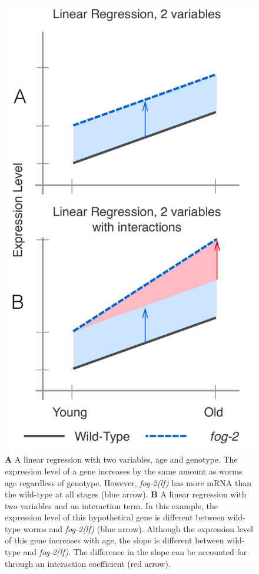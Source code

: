 \documentclass[10pt,letterpaper,twocolumn]{article}
\newcommand{\fog}{\emph{\mbox{fog-2(lf)}}}
\begin{document}
\begin{figure}[htbp]
\renewcommand{\familydefault}{\sfdefault}\normalfont{}
\centering
\includegraphics[width=0.9\linewidth]{../../output/figs/final_figs/linear_regression.pdf}
\caption{\textbf{A} A linear regression with two variables, age and genotype.
The expression level of a gene increases by the same amount as worms age
regardless of genotype. However, \fog{} has more mRNA than the wild-type at all
stages (blue arrow). \textbf{B} A linear regression with two variables and an
interaction term. In this example, the expression level of this hypothetical
gene is different between wild-type worms and \fog{} (blue arrow). Although the
expression level of this gene increases with age, the slope is different between
wild-type and \fog{}. The difference in the slope can be accounted for through
an interaction coefficient (red arrow).
}
\label{fig:linear_reg}
\end{figure}
\end{document}
